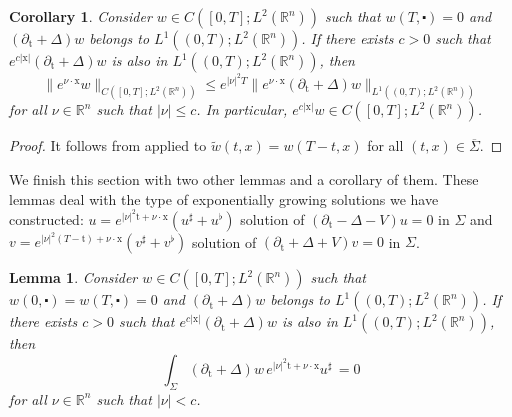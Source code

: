 \documentclass[10pt,a4paper]{amsart}
\newtheorem{corollary}[proposition]{Corollary}
\newtheorem{lemma}[proposition]{Lemma}
\theoremstyle{remark}
\theoremstyle{definition}
\newcommand{\R}{\mathbb{R}}
\newcommand{\tm}{\mathrm{t}}
\newcommand{\x}{\mathrm{x}}
\begin{document}
\begin{corollary}\label{cor:propag_decay}\sl Consider $w \in C([0, T] ; L^{2}(\mathbb{R}^{n}))$ such that 
$w(T, \centerdot)=0$ 
and $(\partial_{\tm}+\Delta)w $ belongs to $ L^{1}((0, T) ; L^{2}(\mathbb{R}^{n}))$.
If there exists $c > 0$ such that 
$e^{c|\x|} (\partial_{\tm}+\Delta)w $ is also in $ L^{1}((0, T) ; L^{2}(\mathbb{R}^{n}))$, then
\[ \|e^{\nu \cdot \x} w\|_{C([0, T] ; L^{2}(\mathbb{R}^{n}))} \leq e^{|\nu|^2 T} \|e^{\nu \cdot \x} (\partial_{\tm}+\Delta)w\|_{L^{1}((0, T) ; L^{2}(\mathbb{R}^{n}))} \]
for all $\nu \in \R^n$ such that $|\nu| \leq c$. In particular, $e^{c|\x|} w \in C([0, T] ; L^{2}(\mathbb{R}^{n}))$.
\end{corollary}

\begin{proof}
It follows from  applied to $\tilde w (t, x) = w (T-t, x) $ for all
$(t, x) \in \overline{\Sigma}$.
\end{proof}

We finish this section with two other lemmas and a corollary of them. These lemmas deal with the
type of exponentially growing solutions we have constructed: $u = e^{|\nu|^2 \tm + \nu \cdot \x} (u^\sharp + u^\flat)$ solution of $(\partial_\tm - \Delta - V) u = 0$ in $\Sigma$ and 
$v = e^{|\nu|^2 (T - \tm) + \nu \cdot \x} (v^\sharp + v^\flat)$ solution of 
$(\partial_\tm + \Delta + V) v = 0$ in $\Sigma$.


\begin{lemma}\label{lem:usharp}\sl
Consider $w \in C([0, T] ; L^{2}(\mathbb{R}^{n}))$ such that 
$w (0, \centerdot) = w(T, \centerdot)=0$ 
and $(\partial_{\tm}+\Delta)w $ belongs to $ L^{1}((0, T) ; L^{2}(\mathbb{R}^{n}))$.
If there exists $c > 0$ such that 
$e^{c|\x|} (\partial_{\tm}+\Delta)w $ is also in $ L^{1}((0, T) ; L^{2}(\mathbb{R}^{n}))$, then
\[\int_{\Sigma}( \partial_{\tm}+\Delta) w \, e^{|\nu|^2 \tm + \nu \cdot \x} u^\sharp \, = 0 \]
for all $\nu \in \R^n$ such that $|\nu| < c$.
\end{lemma}
\end{document}
